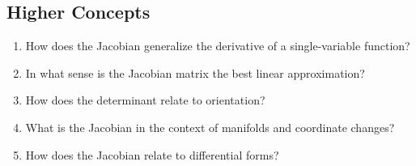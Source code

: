 \subsection{Higher Concepts}

\begin{enumerate}

\item How does the Jacobian generalize the derivative of a single-variable function?

\item In what sense is the Jacobian matrix the best linear approximation?

\item How does the determinant relate to orientation?

\item What is the Jacobian in the context of manifolds and coordinate changes?

\item How does the Jacobian relate to differential forms?

\end{enumerate}
